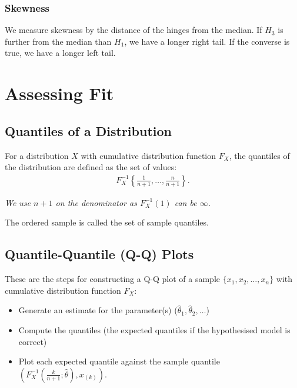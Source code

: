 \documentclass[a4paper, 12pt, twoside]{article}
\begin{document}
\subsubsection{Skewness}

We measure skewness by the distance of the hinges from the median.
If $H_3$ is further from the median than $H_1$, we have a longer
right tail. If the converse is true, we have a longer left tail.

\section{Assessing Fit}

\subsection{Quantiles of a Distribution}

For a distribution $X$ with cumulative distribution function
$F_X$, the quantiles of the distribution are defined as the set
of values:
\begin{align*}
    F_X^{-1} \left\{ \frac{1}{n+1}, \ldots, \frac{n}{n+1} \right\}.
\end{align*}

\textit{We use $n + 1$ on the denominator as $F_X^{-1}(1)$ can be
$\infty$.}

\vspace{\baselineskip}

The ordered sample is called the set of sample quantiles.

\newpage

\subsection{Quantile-Quantile (Q-Q) Plots}

These are the steps for constructing a Q-Q plot of a sample
$\{x_1, x_2, \ldots, x_n\}$ with cumulative distribution function
$F_X$:

\begin{itemize}
    \item Generate an estimate for the parameter(s)
          ($\hat\theta_1, \hat\theta_2, \ldots$)
    \item Compute the quantiles (the expected quantiles if the
          hypothesised model is correct)
    \item Plot each expected quantile against the sample quantile
          $(F_X^{-1}(\frac{k}{n + 1}; \hat\theta), x_{(k)})$.
\end{itemize}
\end{document}
